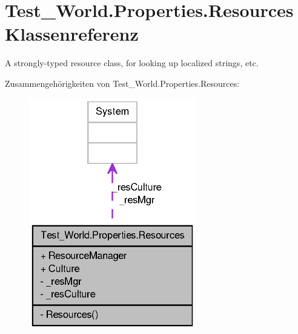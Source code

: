 \hypertarget{class_test___world_1_1_properties_1_1_resources}{
\section{Test\_\-World.Properties.Resources Klassenreferenz}
\label{class_test___world_1_1_properties_1_1_resources}
}


A strongly-\/typed resource class, for looking up localized strings, etc.  




Zusammengehörigkeiten von Test\_\-World.Properties.Resources:\nopagebreak
\begin{figure}[H]
\begin{center}
\leavevmode
\includegraphics[width=206pt]{class_test___world_1_1_properties_1_1_resources__coll__graph}
\end{center}
\end{figure}
